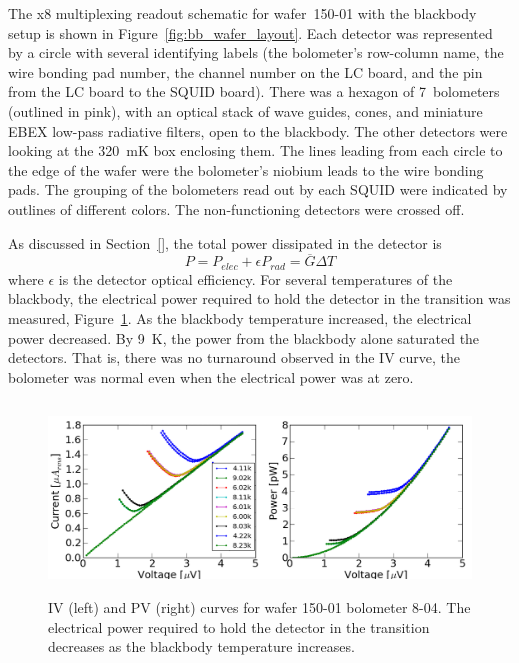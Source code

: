 The x8 multiplexing readout schematic for wafer~150-01 with the blackbody setup is shown in Figure~\ref{fig:bb_wafer_layout}. 
Each detector was represented by a circle with several identifying labels (the bolometer's row-column name, the wire bonding pad number, the channel number on the \ac{LC} board, and the pin from the \ac{LC} board to the \ac{SQUID} board).
There was a hexagon of 7~bolometers (outlined in pink), with an optical stack of wave guides, cones, and miniature \ac{EBEX} low-pass radiative filters, open to the blackbody. 
The other detectors were looking at the 320~mK box enclosing them. %
The lines leading from each circle to the edge of the wafer were the bolometer's niobium leads to the wire bonding pads. 
The grouping of the bolometers read out by each \ac{SQUID} were indicated by outlines of different colors.
The non-functioning detectors were crossed off. 

As discussed in Section~\ref{}, the total power dissipated in the detector is
\begin{equation}
P = P_{elec} + \epsilon P_{rad} = \overline{G} \Delta T
\label{eq:bolo_power}
\end{equation}
where $\epsilon$ is the detector optical efficiency. 
For several temperatures of the blackbody, the electrical power required to hold the detector in the transition was measured, Figure~\ref{fig:opt_eff_bb_curves}.
As the blackbody temperature increased, the electrical power decreased.  
By 9~K, the power from the blackbody alone saturated the detectors. 
That is, there was no turnaround observed in the IV curve, the bolometer was normal even when the electrical power was at zero. 

\begin{figure}[htp]
\begin{center}
\includegraphics[height=2in]{figures/SqCh2_Ch1_all_bb_curves.png}
\caption{IV (left) and PV (right) curves for wafer 150-01 bolometer 8-04. The electrical power required to hold the detector in the transition decreases as the blackbody temperature increases. 
\label{fig:opt_eff_bb_curves} }
\end{center}
\end{figure}

